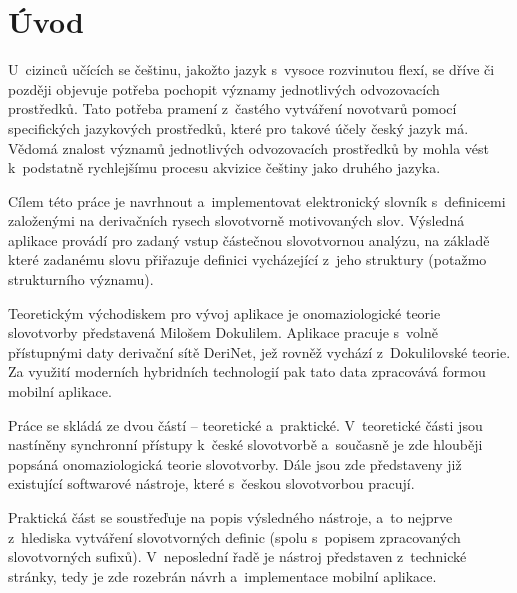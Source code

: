 \hypertarget{uxfavod}{%
\chapter*{Úvod}\label{uvod}
}

U~cizinců učících se češtinu, jakožto jazyk s~vysoce rozvinutou flexí,
se dříve či později objevuje potřeba pochopit významy jednotlivých
odvozovacích prostředků. Tato potřeba pramení z~častého vytváření
novotvarů pomocí specifických jazykových prostředků, které pro takové
účely český jazyk má. Vědomá znalost významů jednotlivých odvozovacích
prostředků by mohla vést k~podstatně rychlejšímu procesu akvizice
češtiny jako druhého jazyka.

Cílem této práce je navrhnout a~implementovat elektronický slovník
s~definicemi založenými na derivačních rysech slovotvorně motivovaných
slov. Výsledná aplikace provádí pro zadaný vstup částečnou slovotvornou
analýzu, na základě které zadanému slovu přiřazuje definici vycházející
z~jeho struktury (potažmo strukturního významu).

Teoretickým východiskem pro vývoj aplikace je onomaziologické teorie
slovotvorby představená Milošem Dokulilem. Aplikace pracuje s~volně
přístupnými daty derivační sítě DeriNet, jež rovněž vychází
z~Dokulilovské teorie. Za využití moderních hybridních technologií pak
tato data zpracovává formou mobilní aplikace.

Práce se skládá ze dvou částí -- teoretické a~praktické. V~teoretické
části jsou nastíněny synchronní přístupy k~české slovotvorbě a~současně
je zde hlouběji popsáná onomaziologická teorie slovotvorby. Dále jsou
zde představeny již existující softwarové nástroje, které s~českou
slovotvorbou pracují.

Praktická část se soustřeďuje na popis výsledného nástroje, a~to nejprve
z~hlediska vytváření slovotvorných definic (spolu s~popisem zpracovaných
slovotvorných sufixů). V~neposlední řadě je nástroj představen
z~technické stránky, tedy je zde rozebrán návrh a~implementace mobilní
aplikace.
